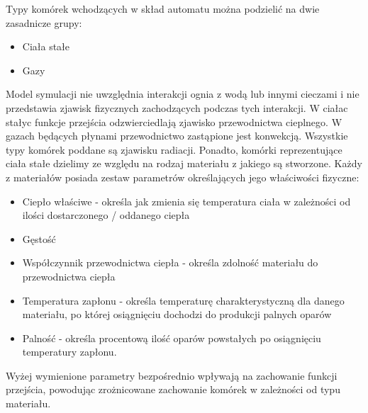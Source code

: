 Typy komórek wchodzących w skład automatu można podzielić na dwie zasadnicze grupy:
\begin{itemize}
\item Ciała stałe
\item Gazy
\end{itemize}
Model symulacji nie uwzględnia interakcji ognia z wodą lub innymi cieczami i nie przedstawia zjawisk fizycznych zachodzących podczas tych interakcji.
W ciałac stałyc funkcje przejścia odzwierciedlają zjawisko przewodnictwa cieplnego. W gazach będących płynami przewodnictwo zastąpione jest konwekcją.
Wszystkie typy komórek poddane są zjawisku radiacji.
Ponadto, komórki reprezentujące ciała stałe dzielimy ze względu na rodzaj materiału z jakiego są stworzone.
Każdy z materiałów posiada zestaw parametrów określających jego właściwości fizyczne:
\begin{itemize}
\item Ciepło właściwe - określa jak zmienia się temperatura ciała w zależności od ilości dostarczonego / oddanego ciepła
\item Gęstość
\item Współczynnik przewodnictwa ciepła - określa zdolność materiału do przewodnictwa ciepła
\item Temperatura zapłonu - określa temperaturę charakterystyczną dla danego materiału, po której osiągnięciu 
	dochodzi do produkcji palnych oparów
\item Palność - określa procentową ilość oparów powstałych po osiągnięciu temperatury zapłonu. 
\end{itemize}
Wyżej wymienione parametry bezpośrednio wpływają na zachowanie funkcji przejścia, powodując zrożnicowane zachowanie komórek w zależności od typu materiału.


